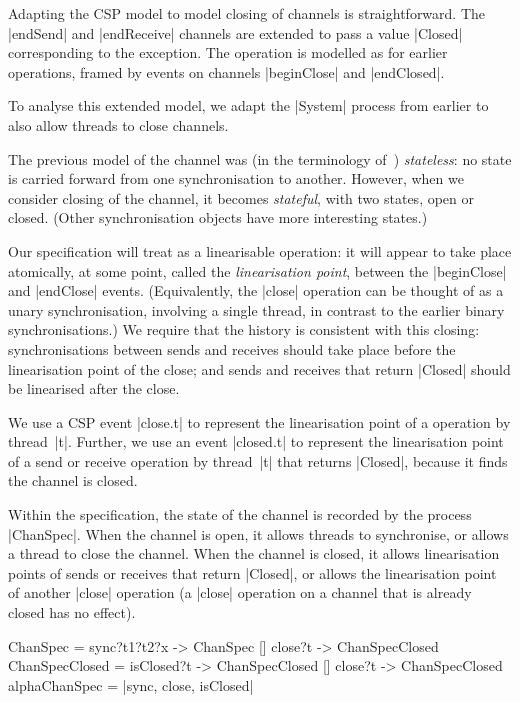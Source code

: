 
\inlineCSP

Adapting the CSP model to model closing of channels is straightforward.  The
|endSend| and |endReceive| channels are extended to pass a value |Closed|
corresponding to the  exception.  The  operation is
modelled as for earlier operations, framed by events on channels |beginClose|
and |endClosed|.


To analyse this extended model, we adapt the |System| process from earlier to
also allow threads to close channels.  

The previous model of the channel was (in the terminology
of~\cite{LL:synchronisation}) \emph{stateless}: no state is carried forward
from one synchronisation to another.  However, when we consider closing of the
channel, it becomes \emph{stateful}, with two states, open or closed.  (Other
synchronisation objects have more interesting states.)  

Our specification will treat  as a linearisable operation: it
will appear to take place atomically, at some point, called the
\emph{linearisation point}, between the |beginClose| and |endClose| events.
(Equivalently, the |close| operation can be thought of as a unary
synchronisation, involving a single thread, in contrast to the earlier binary
synchronisations.)  We require that the history is consistent with this
closing: synchronisations between sends and receives should take place before
the linearisation point of the close; and sends and receives that return
|Closed| should be linearised after the close.

We use a CSP event |close.t| to represent the linearisation point of a
 operation by thread~|t|.  Further, we use an event |closed.t| to
represent the linearisation point of a send or receive operation by thread~|t|
that returns |Closed|, because it finds the channel is closed.

Within the specification, the state of the channel is recorded by the process
|ChanSpec|.  When the channel is open, it allows threads to synchronise, or
allows a thread to close the channel.  When the channel is closed, it allows
linearisation points of sends or receives that return |Closed|, or allows the
linearisation point of another |close| operation (a |close| operation on a
channel that is already closed has no effect).
%
\begin{cspm}
ChanSpec = sync?t1?t2?x -> ChanSpec [] close?t -> ChanSpecClosed
ChanSpecClosed = isClosed?t -> ChanSpecClosed [] close?t -> ChanSpecClosed
alphaChanSpec = {|sync, close, isClosed|} 
\end{cspm}

